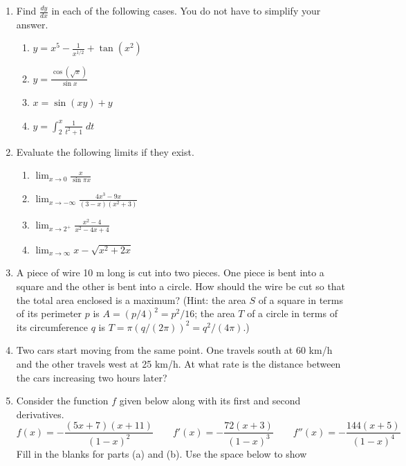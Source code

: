 \documentclass[12pt,legalpaper]{article}
\newcommand{\ds}{\displaystyle}
\begin{document}
\begin{enumerate}
\item Find
  $\ds \frac{dy}{dx}$ in each of the following cases.
  You do not have to simplify your answer.
  \begin{enumerate}
  \item $\ds y = x^5 - \frac{1}{x^{1/2}} + \tan(x^2)$
\vfill
  \item $\ds y = \frac{\cos(\sqrt{x})}{\sin x}$
\vfill
  \item $\ds x=\sin\left(xy\right)+y$
\vfill
  \item $\ds y=\int_2^{x} \frac{1}{t^2+1} \; dt$
\vfill
  \end{enumerate}
\newpage
\item Evaluate
  the following limits if they exist.
  \begin{enumerate}
  \item $\ds \lim_{x\to 0} \frac{x}{\sin \pi x}$
\vfill
  \item $\ds \lim_{x\to -\infty} \frac{4x^3-9x}{(3-x)(x^2+3)}$
\vfill
  \item $\ds \lim_{x\to 2^+} \frac{x^2-4}{x^2-4x+4}$
\vfill
  \item $\ds \lim_{x\to \infty} x-\sqrt{x^2+2x}$
\vfill
  \end{enumerate}
\newpage
\item A 
  piece of wire 10 m long is cut into two pieces.  One piece is bent
  into a square and the other is bent into a circle.  How should the wire
  be cut so that the total area enclosed is a maximum?  (Hint: the area $S$ of
  a square in terms of its perimeter $p$ is $A=(p/4)^2=p^2/16$; 
  the area $T$ of a circle in terms of its circumference $q$ 
  is $T=\pi(q/(2\pi))^2=q^2/(4\pi)$.)
\vfill
\newpage
\item Two cars start moving from the same
  point.  One travels south at 60 km/h and the other travels west at 25
  km/h.  At what rate is the distance between the cars increasing two
  hours later?
\vfill
\newpage
\item Consider the function $f$ given below
  along with its first and second derivatives.
  \begin{displaymath}
    f(x) = -\frac{(5x+7)(x+11)}{(1-x)^2}
    \qquad
    f'(x) = -\frac{72(x+3)}{(1-x)^3}
    \qquad
    f''(x) = -\frac{144(x+5)}{(1-x)^4}
  \end{displaymath}
  Fill in the blanks for parts (a) and (b).  Use the space below to show

\end{enumerate}
\end{document}
